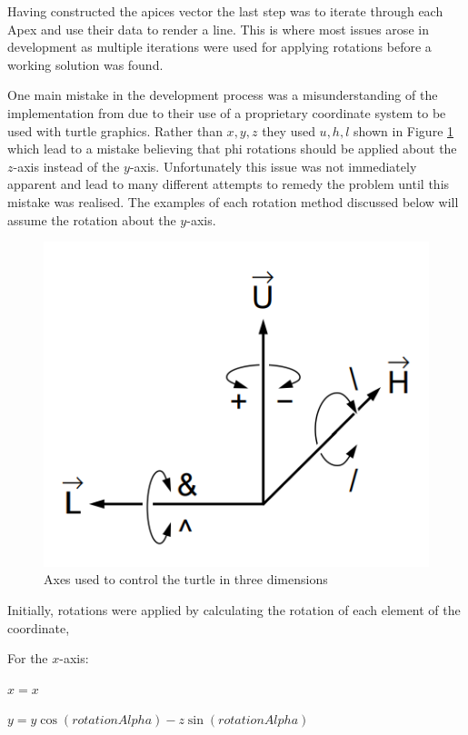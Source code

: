 \documentclass[final]{cmpreport}
\begin{document}
Having constructed the apices vector the last step was to iterate through each Apex and use their 
data to render a line. This is where most issues arose in development as multiple iterations were 
used for applying rotations before a working solution was found.

One main mistake in the development process was a misunderstanding of the implementation from 
\cite{prusinkiewicz1996systems} due to their use of a proprietary coordinate system to be used 
with turtle graphics. Rather than $x, y, z$ they used $u, h, l$ shown in Figure \ref{fig:uhl-coords} 
which lead to a mistake believing that phi rotations should be applied about the $z$-axis 
instead of the $y$-axis. Unfortunately this issue was not immediately apparent and lead to many 
different attempts to remedy the problem until this mistake was realised. The examples of each 
rotation method discussed below will assume the rotation about the $y$-axis.

\begin{figure}[ht]
    \includegraphics[scale=0.4]{uhl-coords.PNG} 
    \centering
    \captionsetup{justification=centering}
    \caption{Axes used to control the turtle in three dimensions}
    \label{fig:uhl-coords}
\end{figure}

Initially, rotations were applied by calculating the rotation of each element of the coordinate,

For the $x$-axis:

$x = x$

$y = y\cos(rotationAlpha) - z\sin(rotationAlpha)$
\end{document}
